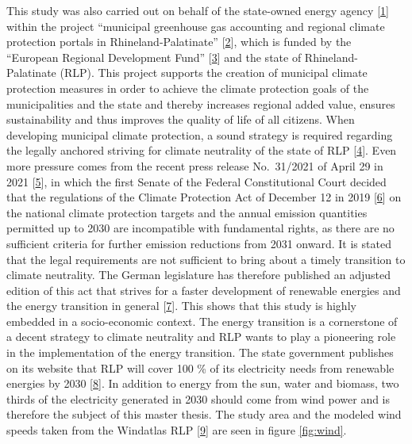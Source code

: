 \documentclass[a4paper,11pt]{article}
\begin{document}
This study was also carried out on behalf of the state-owned energy agency {[}\protect\hyperlink{ref-EnergieagenturRheinlandPfalz.2021}{1}{]} within the project ``municipal greenhouse gas accounting and regional climate protection portals in Rhineland-Palatinate'' {[}\protect\hyperlink{ref-KomBiReK.2021}{2}{]}, which is funded by the ``European Regional Development Fund'' {[}\protect\hyperlink{ref-EuropeanRegionalDevelopmentFund.2021}{3}{]} and the state of Rhineland-Palatinate (RLP). This project supports the creation of municipal climate protection measures in order to achieve the climate protection goals of the municipalities and the state and thereby increases regional added value, ensures sustainability and thus improves the quality of life of all citizens. When developing municipal climate protection, a sound strategy is required regarding the legally anchored striving for climate neutrality of the state of RLP {[}\protect\hyperlink{ref-RheinlandPfalz.19.08.2014}{4}{]}. Even more pressure comes from the recent press release No.~31/2021 of April 29 in 2021 {[}\protect\hyperlink{ref-Bundesverfassungsgericht.24.03.2021}{5}{]}, in which the first Senate of the Federal Constitutional Court decided that the regulations of the Climate Protection Act of December 12 in 2019 {[}\protect\hyperlink{ref-BundesamtfurJustiz.2019}{6}{]} on the national climate protection targets and the annual emission quantities permitted up to 2030 are incompatible with fundamental rights, as there are no sufficient criteria for further emission reductions from 2031 onward. It is stated that the legal requirements are not sufficient to bring about a timely transition to climate neutrality. The German legislature has therefore published an adjusted edition of this act that strives for a faster development of renewable energies and the energy transition in general {[}\protect\hyperlink{ref-BundesministeriumfurUmweltNaturschutzundnukleareSicherheit.12.05.2021}{7}{]}. This shows that this study is highly embedded in a socio-economic context. The energy transition is a cornerstone of a decent strategy to climate neutrality and RLP wants to play a pioneering role in the implementation of the energy transition. The state government publishes on its website that RLP will cover 100 \% of its electricity needs from renewable energies by 2030 {[}\protect\hyperlink{ref-LandesregierungRheinlandPfalz.2021}{8}{]}. In addition to energy from the sun, water and biomass, two thirds of the electricity generated in 2030 should come from wind power and is therefore the subject of this master thesis. The study area and the modeled wind speeds taken from the Windatlas RLP {[}\protect\hyperlink{ref-MinisteriumfurWirtschaftKlimaschutzEnergieundLandesplanung.2013}{9}{]} are seen in figure \ref{fig:wind}.
\end{document}
